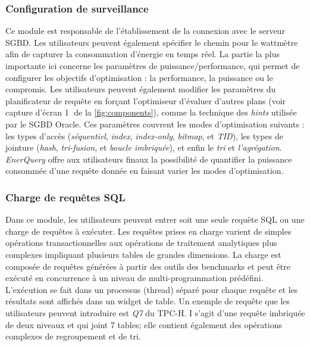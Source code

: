 \subsubsection{Configuration de surveillance}\label{subsec:Configuration}
Ce module est responsable de l'établissement de la connexion avec le serveur SGBD. Les utilisateurs peuvent également spécifier le chemin pour le wattmètre afin de capturer la consommation d'énergie en temps réel. La partie la plus importante ici concerne les paramètres de puissance/performance, qui permet de configurer les objectifs d'optimisation : la performance, la puissance ou le compromis. Les utilisateurs peuvent également modifier les paramètres du planificateur de requête en forçant l'optimiseur d'évaluer d'autres plans (voir capture d'écran \textcircled{1} de la \ref{fig:components}), comme la technique des \textit{hints} utilisée par le SGBD Oracle. Ces paramètres couvrent les modes d'optimisation suivants : les types d'accès (\textit{séquentiel}, \textit{index}, \textit{index-only}, \textit{bitmap}, et \textit {TID}), les types de jointure (\textit{hash}, \textit{tri-fusion}, et \textit{boucle imbriquée}), et enfin le \textit{tri} et \textit{l'agrégation}. \textit{EnerQuery} offre aux utilisateurs finaux la possibilité de quantifier la puissance consommée d'une requête donnée en faisant varier les modes d'optimisation.

\subsubsection{Charge de requêtes SQL}\label{subsec:SQLQuery}
Dans ce module, les utilisateurs peuvent entrer soit une seule requête SQL ou une charge de requêtes à exécuter. Les requêtes prises en charge varient de simples opérations transactionnelles aux opérations de traitement analytiques plus complexes impliquant plusieurs tables de grandes dimensions. La charge est composée de requêtes générées à partir des outils des benchmarks et peut être exécuté en concurrence à un niveau de multi-programmation prédéfini. L'exécution se fait dans un processus (thread) séparé pour chaque requête et les résultats sont affichés dans un widget de table. Un exemple de requête que les utilisateurs peuvent introduire est \textit{Q7} du TPC-H. I s'agit d'une requête imbriquée de deux niveaux et qui joint 7 tables; elle contient également des opérations complexes de regroupement et de tri.

